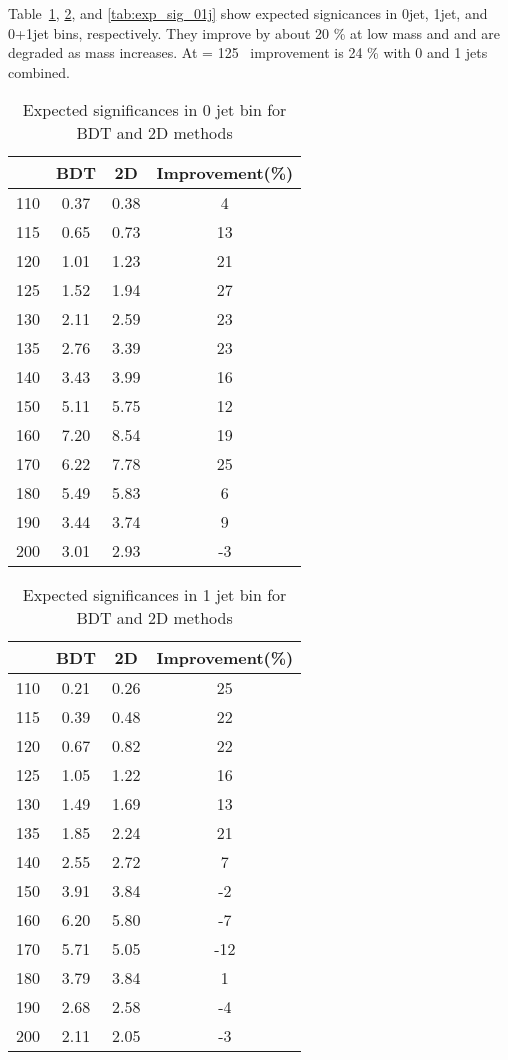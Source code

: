 Table~\ref{tab:exp_sig_0j}, \ref{tab:exp_sig_1j}, and \ref{tab:exp_sig_01j} 
show expected signicances in 0jet, 1jet, and 0+1jet bins, respectively.
They improve by about 20 \% at low mass and 
and are degraded as mass increases. 
At \mHi = 125 \GeV~improvement is 24 \% with 0 and 1 jets combined.

\begin{table}[!htb] 
	\centering
	\begin{tabular}{c | c c | c }
   	\hline \hline
	\mHi & BDT & 2D & Improvement(\%) \\
	\hline
	110 & 0.37 & 0.38 & 4\\
	115 & 0.65 & 0.73 & 13\\
	120 & 1.01 & 1.23 & 21\\
	125 & 1.52 & 1.94 & 27\\
	130 & 2.11 & 2.59 & 23\\
	135 & 2.76 & 3.39 & 23\\
	140 & 3.43 & 3.99 & 16\\
	150 & 5.11 & 5.75 & 12\\
	160 & 7.20 & 8.54 & 19\\
	170 & 6.22 & 7.78 & 25\\
	180 & 5.49 & 5.83 & 6\\
	190 & 3.44 & 3.74 & 9\\
	200 & 3.01 & 2.93 & -3\\
   	\hline \hline
	\end{tabular}
	\label{tab:exp_sig_0j}
	\caption{Expected significances in 0 jet bin for BDT and 2D methods}
\end{table}


\begin{table}[!htb] 
	\centering
	\begin{tabular}{c | c c | c }
   	\hline \hline
	\mHi & BDT & 2D & Improvement(\%) \\
	\hline
	110 & 0.21 & 0.26 & 25\\
	115 & 0.39 & 0.48 & 22\\
	120 & 0.67 & 0.82 & 22\\
	125 & 1.05 & 1.22 & 16\\
	130 & 1.49 & 1.69 & 13\\
	135 & 1.85 & 2.24 & 21\\
	140 & 2.55 & 2.72 & 7\\
	150 & 3.91 & 3.84 & -2\\
	160 & 6.20 & 5.80 & -7\\
	170 & 5.71 & 5.05 & -12\\
	180 & 3.79 & 3.84 & 1\\
	190 & 2.68 & 2.58 & -4\\
	200 & 2.11 & 2.05 & -3\\
   	\hline \hline
	\end{tabular}
	\label{tab:exp_sig_1j}
	\caption{Expected significances in 1 jet bin for BDT and 2D methods}
\end{table}
  

